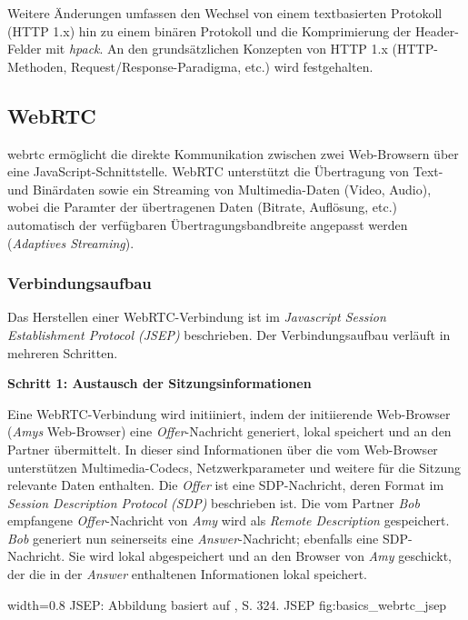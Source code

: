 Weitere Änderungen umfassen den Wechsel von einem textbasierten Protokoll
(HTTP 1.x) hin zu einem binären Protokoll und die Komprimierung der
Header-Felder mit \emph{hpack}. An den grundsätzlichen Konzepten von
HTTP 1.x (HTTP-Methoden, Request/Response-Paradigma, etc.) wird
festgehalten.

\subsection{WebRTC}\label{webrtc}

\gls{webrtc} ermöglicht die direkte Kommunikation zwischen zwei Web-Browsern
über eine JavaScript-Schnittstelle. WebRTC unterstützt die Übertragung
von Text- und Binärdaten sowie ein Streaming von Multimedia-Daten (Video,
Audio), wobei die Paramter der übertragenen Daten (Bitrate, Auflösung,
etc.) automatisch der verfügbaren Übertragungsbandbreite angepasst
werden (\emph{Adaptives Streaming}).

\subsubsection*{Verbindungsaufbau}\label{verbindungsaufbau}

Das Herstellen einer WebRTC-Verbindung ist im \emph{Javascript Session
Establishment Protocol (JSEP)} beschrieben. Der Verbindungsaufbau
verläuft in mehreren Schritten.

\textbf{Schritt 1: Austausch der Sitzungsinformationen}

Eine WebRTC-Verbindung wird initiiniert, indem der initiierende
Web-Browser (\emph{Amys} Web-Browser) eine \emph{Offer}-Nachricht
generiert, lokal speichert und an den Partner übermittelt. In
dieser sind Informationen über die vom Web-Browser unterstützen
Multimedia-Codecs, Netzwerkparameter und weitere für die Sitzung
relevante Daten enthalten. Die \emph{Offer} ist eine SDP-Nachricht,
deren Format im \emph{Session Description Protocol (SDP)} beschrieben
ist. Die vom Partner \emph{Bob} empfangene \emph{Offer}-Nachricht von
\emph{Amy} wird als \emph{Remote Description} gespeichert. \emph{Bob}
generiert nun seinerseits eine \emph{Answer}-Nachricht; ebenfalls eine
SDP-Nachricht. Sie wird lokal abgespeichert und an den Browser von
\emph{Amy} geschickt, der die in der \emph{Answer} enthaltenen
Informationen lokal speichert.

   {width=0.8\textwidth}
   {JSEP: Abbildung basiert auf \cite{Grigorik2013}, S. 324.}
   {JSEP}
   {fig:basics_webrtc_jsep}

